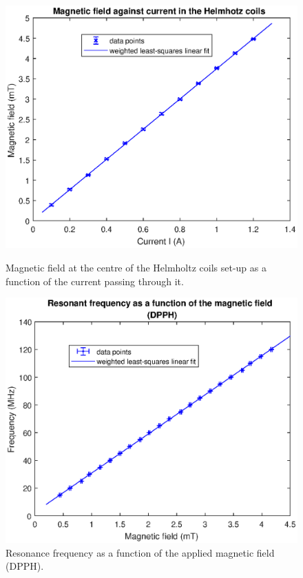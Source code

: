 \documentclass[a4paper]{jpconf}
\numberwithin{equation}{section}
\begin{document}
\begin{figure}[htbp]
	\begin{minipage}[b]{2.9in}
		\includegraphics[scale=0.6]{ESR_calibration.eps}
		\caption{Magnetic field at the centre of the Helmholtz coils set-up as a function of the current passing through it.}
		\label{fig: HC calibration curve}
	\end{minipage}
    \hspace{1.5pc}
	\begin{minipage}[b]{3in}
		\includegraphics[scale=0.6]{DPPH.eps}
		\caption{Resonance frequency as a function of the applied magnetic field (DPPH).}
		\label{fig: DPPH resonance}
	\end{minipage}
\end{figure}
\end{document}
